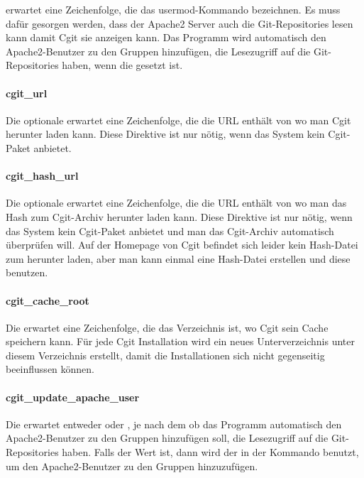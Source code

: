 erwartet eine Zeichenfolge, die das usermod-Kommando bezeichnen. Es muss dafür gesorgen werden, dass der Apache2 Server auch die Git-Repositories lesen kann damit Cgit sie anzeigen kann. Das Programm wird automatisch den Apache2-Benutzer zu den Gruppen hinzufügen, die Lesezugriff auf die Git-Repositories haben, wenn die  gesetzt ist.

\paragraph{cgit\_url}

Die optionale  erwartet eine Zeichenfolge, die die URL enthält von wo man Cgit herunter laden kann. Diese Direktive ist nur nötig, wenn das System kein Cgit-Paket anbietet.

\paragraph{cgit\_hash\_url}

Die optionale  erwartet eine Zeichenfolge, die die URL enthält von wo man das Hash zum Cgit-Archiv herunter laden kann. Diese Direktive ist nur nötig, wenn das System kein Cgit-Paket anbietet und man das Cgit-Archiv automatisch überprüfen will. Auf der Homepage von Cgit befindet sich leider kein Hash-Datei zum herunter laden, aber man kann einmal eine Hash-Datei erstellen und diese benutzen.

\paragraph{cgit\_cache\_root}

Die  erwartet eine Zeichenfolge, die das Verzeichnis ist, wo Cgit sein Cache speichern kann. Für jede Cgit Installation wird ein neues Unterverzeichnis unter diesem Verzeichnis erstellt, damit die Installationen sich nicht gegenseitig beeinflussen können.

\paragraph{cgit\_update\_apache\_user}

Die  erwartet entweder  oder , je nach dem ob das Programm automatisch den Apache2-Benutzer zu den Gruppen hinzufügen soll, die Lesezugriff auf die Git-Repositories haben. Falls der Wert  ist, dann wird der in der  Kommando benutzt, um den Apache2-Benutzer zu den Gruppen hinzuzufügen.

